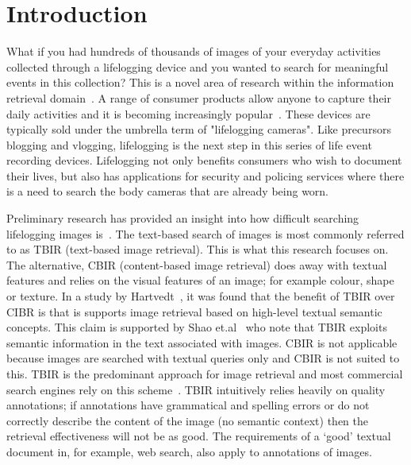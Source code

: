 \chapter{Introduction}

What if you had hundreds of thousands of images of your everyday activities collected through a lifelogging device and you wanted to search for meaningful events in this collection? This is a novel area of research within the information retrieval domain~\cite{gurrin2014lifelogging}. A range of consumer products allow anyone to capture their daily activities and it is becoming increasingly popular~\cite{gurrin2014lifelogging}\cite{van2014future}\cite{askoxylakis2011log}. These devices are typically sold under the umbrella term of "lifelogging cameras". Like precursors blogging and vlogging, lifelogging is the next step in this series of life event recording devices. Lifelogging not only benefits consumers who wish to document their lives, but also has applications for security and policing services where there is a need to search the body cameras that are already being worn.

Preliminary research has provided an insight into how difficult searching lifelogging images is~\cite{scells2016qut}. The text-based search of images is most commonly referred to as TBIR (text-based image retrieval). This is what this research focuses on. The alternative, CBIR (content-based image retrieval) does away with textual features and relies on the visual features of an image; for example colour, shape or texture. In a study by Hartvedt~\cite{hartvedt2010using}, it was found that the benefit of TBIR over CIBR is that is supports image retrieval based on high-level textual semantic concepts. This claim is supported by Shao et.al~\cite{medical2004shao} who note that TBIR exploits semantic information in the text associated with images. CBIR is not applicable because images are searched with textual queries only and CBIR is not suited to this. TBIR is the predominant approach for image retrieval and most commercial search engines rely on this scheme~\cite{escalante2007towards}. TBIR intuitively relies heavily on quality annotations; if annotations have grammatical and spelling errors or do not correctly describe the content of the image (no semantic context) then the retrieval effectiveness will not be as good. The requirements of a `good' textual document in, for example, web search, also apply to annotations of images.

